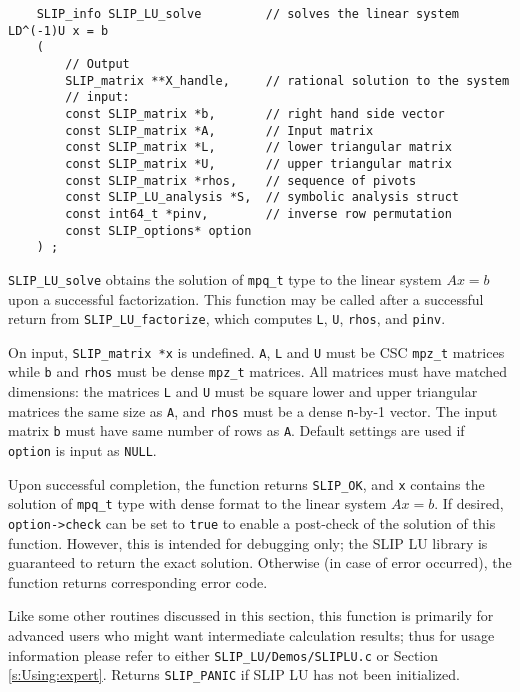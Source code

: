 \documentclass[12pt]{article}
\theoremstyle{definition}
\begin{document}
\begin{mdframed}[userdefinedwidth=6in]
{\footnotesize
\begin{verbatim}
    SLIP_info SLIP_LU_solve         // solves the linear system LD^(-1)U x = b
    (
        // Output
        SLIP_matrix **X_handle,     // rational solution to the system
        // input:
        const SLIP_matrix *b,       // right hand side vector
        const SLIP_matrix *A,       // Input matrix
        const SLIP_matrix *L,       // lower triangular matrix
        const SLIP_matrix *U,       // upper triangular matrix
        const SLIP_matrix *rhos,    // sequence of pivots
        const SLIP_LU_analysis *S,  // symbolic analysis struct
        const int64_t *pinv,        // inverse row permutation
        const SLIP_options* option
    ) ;
\end{verbatim}
} \end{mdframed}

\verb|SLIP_LU_solve| obtains the solution of \verb|mpq_t| type to the linear
system $Ax=b$ upon a successful factorization.  This function may be called
after a successful return from \verb|SLIP_LU_factorize|, which computes
\verb|L|, \verb|U|, \verb|rhos|, and \verb|pinv|. 

On input, \verb|SLIP_matrix *x| is undefined. \verb|A|, \verb|L| and \verb|U|
must be CSC \verb|mpz_t| matrices while \verb|b| and \verb|rhos| must be dense
\verb|mpz_t|  matrices. All matrices must have matched dimensions: the matrices
\verb|L| and \verb|U| must be square lower and upper triangular matrices the
same size as \verb|A|, and \verb|rhos| must be a dense \verb|n|-by-1 vector.
The input matrix \verb|b| must have same number of rows as \verb|A|.  Default
settings are used if \verb|option| is input as \verb|NULL|.

Upon successful completion, the function returns \verb|SLIP_OK|, and \verb|x|
contains the solution of \verb|mpq_t| type with dense format to the linear
system $Ax=b$. If desired, \verb|option->check| can be set to \verb|true| to
enable a post-check of the solution of this function.  However, this is
intended for debugging only; the SLIP LU library is guaranteed to return the
exact solution. Otherwise (in case of error occurred), the function returns
corresponding error code.

Like some other routines discussed in this section, this function is primarily
for advanced users who might want intermediate calculation results; thus for
usage information please refer to either \verb|SLIP_LU/Demos/SLIPLU.c| or
Section \ref{s:Using:expert}.  Returns \verb|SLIP_PANIC| if SLIP LU has not
been initialized.
\end{document}
